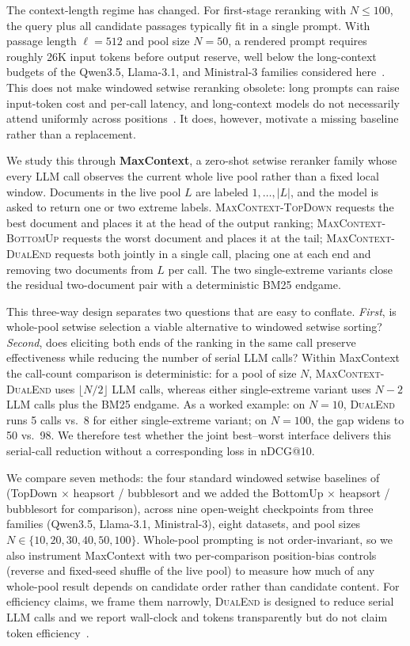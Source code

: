 The context-length regime has changed. For first-stage reranking with $N\!\le\!100$, the query plus all candidate passages typically fit in a single prompt. With passage length $\ell{=}512$ and pool size $N{=}50$, a rendered prompt requires roughly 26K input tokens before output reserve, well below the long-context budgets of the Qwen3.5, Llama-3.1, and Ministral-3 families considered here~\citep{qwen2026qwen35,dubey2024llama3,liu2026ministral3}. This does not make windowed setwise reranking obsolete: long prompts can raise input-token cost and per-call latency, and long-context models do not necessarily attend uniformly across positions~\citep{liu2024lost,zheng2024mcqbias,shi2025positionbias,pradeep2023rankzephyr}. It does, however, motivate a missing baseline rather than a replacement.

We study this through \textbf{MaxContext}, a zero-shot setwise reranker family whose every LLM call observes the current whole live pool rather than a fixed local window. Documents in the live pool $L$ are labeled $1,\ldots,|L|$, and the model is asked to return one or two extreme labels. \textsc{MaxContext-TopDown} requests the best document and places it at the head of the output ranking; \textsc{MaxContext-BottomUp} requests the worst document and places it at the tail; \textsc{MaxContext-DualEnd} requests both jointly in a single call, placing one at each end and removing two documents from $L$ per call. The two single-extreme variants close the residual two-document pair with a deterministic BM25 endgame.

This three-way design separates two questions that are easy to conflate. \emph{First}, is whole-pool setwise selection a viable alternative to windowed setwise sorting? \emph{Second}, does eliciting both ends of the ranking in the same call preserve effectiveness while reducing the number of serial LLM calls? Within MaxContext the call-count comparison is deterministic: for a pool of size $N$, \textsc{MaxContext-DualEnd} uses $\lfloor N/2 \rfloor$ LLM calls, whereas either single-extreme variant uses $N{-}2$ LLM calls plus the BM25 endgame. As a worked example: on $N{=}10$, \textsc{DualEnd} runs 5 calls vs.\ 8 for either single-extreme variant; on $N{=}100$, the gap widens to 50 vs.\ 98. We therefore test whether the joint best--worst interface delivers this serial-call reduction without a corresponding loss in nDCG@10.

We compare seven methods: the four standard windowed setwise baselines of \citet{zhuang2024setwise} (TopDown $\times$ heapsort / bubblesort and we added the BottomUp $\times$ heapsort / bubblesort for comparison), across nine open-weight checkpoints from three families (Qwen3.5, Llama-3.1, Ministral-3), eight datasets, and pool sizes $N \in \{10,20,30,40,50,100\}$. Whole-pool prompting is not order-invariant, so we also instrument MaxContext with two per-comparison position-bias controls (reverse and fixed-seed shuffle of the live pool) to measure how much of any whole-pool result depends on candidate order rather than candidate content. For efficiency claims, we frame them narrowly, \textsc{DualEnd} is designed to reduce serial LLM calls and we report wall-clock and tokens transparently but do not claim token efficiency~\citep{peng2025flopsreranking}.

